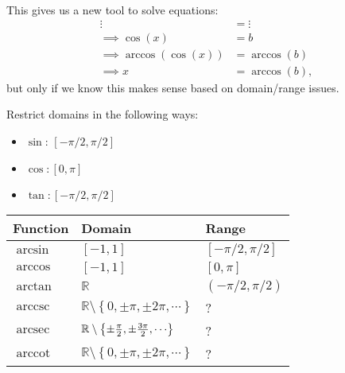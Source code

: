 \begin{remark}

This gives us a new tool to solve equations:
\begin{align*}
\vdots &= \vdots \\
\implies \cos(x) &= b \\
\implies \arccos(\cos(x)) &= \arccos(b) \\
\implies x &= \arccos(b)
,\end{align*}
but only if we know this makes sense based on domain/range issues.

\end{remark}

\begin{proposition}

Restrict domains in the following ways:

\begin{itemize}
\tightlist
\item
  \(\sin\): \([-\pi/2, \pi/2]\)
\item
  \(\cos: [0, \pi]\)
\item
  \(\tan: [-\pi/2, \pi/2]\)
\end{itemize}

\begin{longtable}[]{@{}
  >{\raggedright\arraybackslash}p{}
  >{\raggedright\arraybackslash}p{}
  >{\raggedright\arraybackslash}p{}@{}}
\toprule
Function & Domain & Range \\
\midrule
\endhead
\(\arcsin\) & \([-1, 1]\) & \([-\pi/2, \pi /2]\) \\
\(\arccos\) & \([-1, 1]\) & \([0, \pi]\) \\
\(\arctan\) & \({\mathbb{R}}\) & \((-\pi/2, \pi/2)\) \\
\(\operatorname{arccsc}\) &
\({\mathbb{R}}\setminus\left\{{0, \pm {\pi}, \pm{2\pi}, \cdots}\right\}\)
& ? \\
\(\operatorname{arcsec}\) &
\({\mathbb{R}}\setminus\left\{{\pm {\pi \over 2}, \pm{3\pi \over 2}, \cdots}\right\}\)
& ? \\
\(\operatorname{arccot}\) &
\({\mathbb{R}}\setminus\left\{{0, \pm {\pi}, \pm{2\pi}, \cdots}\right\}\)
& ? \\
\bottomrule
\end{longtable}

\end{proposition}

